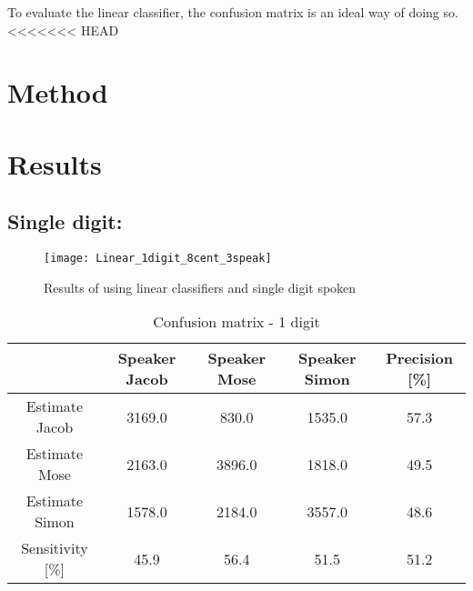 To evaluate the linear classifier, the confusion matrix is an ideal way of doing so.
<<<<<<< HEAD



\section{Method}


\section{Results}
\subsection{Single digit:}

\begin{figure}[H]
\centering
\texttt{[image: Linear\_1digit\_8cent\_3speak]}
\caption{Results of using linear classifiers and single digit spoken}
\label{fig:Lin_fig_1}
\end{figure}

\begin{table}[H]                                                    
\centering                                                          
\begin{tabular}{|c|c|c|c|c|}                                        
\hline                                                              
  & Speaker Jacob & Speaker Mose & Speaker Simon & Precision [\%] \\
\hline                                                              
Estimate Jacob & 3169.0 & 830.0 & 1535.0 & 57.3 \\                  
\hline                                                              
Estimate Mose & 2163.0 & 3896.0 & 1818.0 & 49.5 \\                  
\hline                                                              
Estimate Simon & 1578.0 & 2184.0 & 3557.0 & 48.6 \\                 
\hline                                                              
Sensitivity [\%] & 45.9 & 56.4 & 51.5 & 51.2 \\                     
\hline                                                              
\end{tabular}                                                       
\caption{Confusion matrix - 1 digit}                                
\label{table:Lin_conf_1}                                            
\end{table}     
                   

